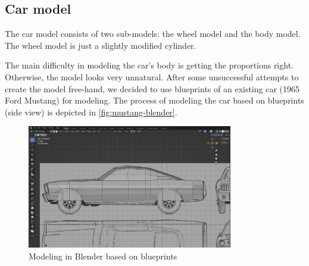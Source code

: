 \subsection{Car model}

The car model consists of two sub-models: the wheel model and the body model.
The wheel model is just a slightly modified cylinder.

The main difficulty in modeling the car's body is getting the proportions right.
Otherwise, the model looks very unnatural.
After some unsuccessful attempts to create the model free-hand, we decided to use blueprints of an existing car (1965 Ford Mustang) for modeling.
The process of modeling the car based on blueprints (side view) is depicted in \autoref{fig:mustang-blender}.

\begin{figure}[!htb]
    \centering
    \includegraphics[width=0.8\textwidth]{chapters/theoretical_foundations/sections/models/resources/mustang-blender.png}
    \caption{Modeling in Blender based on blueprints}
    \label{fig:mustang-blender}
\end{figure}
